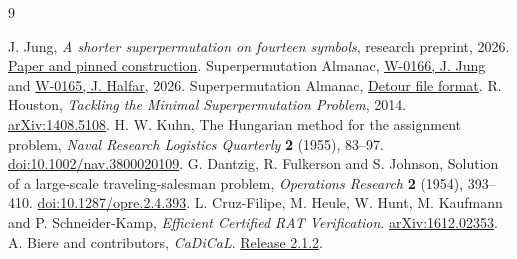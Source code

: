 \documentclass[11pt]{article}
\begin{document}
\begin{thebibliography}{9}\small\raggedright
{} J. Jung, \emph{A shorter superpermutation on fourteen symbols}, research preprint, 2026. \href{https://github.com/aistaralchemist-cyber/superpermutation-bounds-2026/blob/cd6a1bd4609e5ee4fbff74eac99bfd58fe63c6aa/fourteen-symbol-word.pdf}{Paper and pinned construction}.
 Superpermutation Almanac, \href{https://superpermutations.com/w/W-0166}{W-0166, J. Jung} and \href{https://superpermutations.com/w/W-0165}{W-0165, J. Halfar}, 2026.
 Superpermutation Almanac, \href{https://superpermutations.com/docs/format}{Detour file format}.
 R. Houston, \emph{Tackling the Minimal Superpermutation Problem}, 2014. \href{https://arxiv.org/abs/1408.5108}{arXiv:1408.5108}.
 H. W. Kuhn, The Hungarian method for the assignment problem, \emph{Naval Research Logistics Quarterly} \textbf{2} (1955), 83--97. \href{https://doi.org/10.1002/nav.3800020109}{doi:10.1002/nav.3800020109}.
 G. Dantzig, R. Fulkerson and S. Johnson, Solution of a large-scale traveling-salesman problem, \emph{Operations Research} \textbf{2} (1954), 393--410. \href{https://doi.org/10.1287/opre.2.4.393}{doi:10.1287/opre.2.4.393}.
 L. Cruz-Filipe, M. Heule, W. Hunt, M. Kaufmann and P. Schneider-Kamp, \emph{Efficient Certified RAT Verification}. \href{https://arxiv.org/abs/1612.02353}{arXiv:1612.02353}.
 A. Biere and contributors, \emph{CaDiCaL}. \href{https://github.com/arminbiere/cadical/tree/rel-2.1.2}{Release 2.1.2}.
\end{thebibliography}
\end{document}
